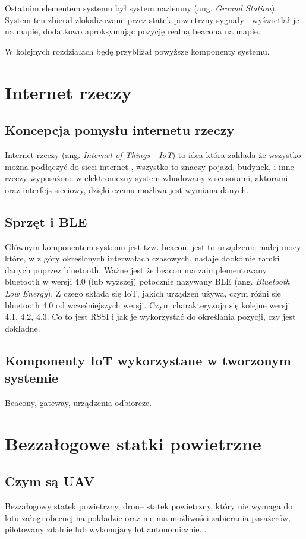 Ostatnim elementem systemu był system naziemny (ang. \textit{Ground Station}). System ten zbierał zlokalizowane przez statek powietrzny sygnały i wyświetlał je na mapie, dodatkowo aproksymując pozycję realną beacona na mapie.

W kolejnych rozdziałach będę przybliżał powyższe komponenty systemu.

\section{Internet rzeczy}
\subsection{Koncepcja pomysłu internetu rzeczy}
Internet rzeczy (ang. \textit{Internet of Things - IoT}) to idea która zakłada że wszystko można podłączyć do sieci internet \cite{iot}, wszystko to znaczy pojazd, budynek, i inne rzeczy wyposażone w elektroniczny system wbudowany z sensorami, aktorami oraz interfejs sieciowy, dzięki czemu możliwa jest wymiana danych. 


\subsection{Sprzęt i BLE}
Głównym komponentem systemu jest tzw. beacon, jest to urządzenie małej mocy które, w z góry określonych interwałach czasowych, nadaje dookólnie ramki danych poprzez bluetooth. Ważne jest że beacon ma zaimplementowany bluetooth w wersji 4.0 (lub wyższej) potocznie nazywany BLE (ang. \textit{Bluetooth Low Energy}).
Z czego składa się IoT, jakich urządzeń używa, czym różni się bluetooth 4.0 od wcześniejszych wersji. Czym charakteryzują się kolejne wersji 4.1, 4.2, 4.3. Co to jest RSSI i jak je wykorzystać do określania pozycji, czy jest dokładne.
\subsection{Komponenty IoT wykorzystane w tworzonym systemie}
Beacony, gateway, urządzenia odbiorcze.

\section{Bezzałogowe statki powietrzne}
\subsection{Czym są UAV}
Bezzałogowy statek powietrzny, dron– statek powietrzny, który nie wymaga do lotu załogi obecnej na pokładzie oraz nie ma możliwości zabierania pasażerów, pilotowany zdalnie lub wykonujący lot autonomicznie...
